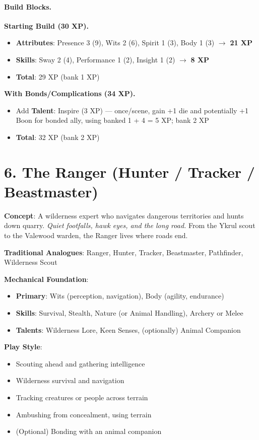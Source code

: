 \paragraph{Build Blocks.}
\textbf{Starting Build (30 XP).}
\begin{itemize}
\item \textbf{Attributes}: Presence 3 (9), Wits 2 (6), Spirit 1 (3), Body 1 (3) $\rightarrow$ \textbf{21 XP}
\item \textbf{Skills}: Sway 2 (4), Performance 1 (2), Insight 1 (2) $\rightarrow$ \textbf{8 XP}
\item \textbf{Total}: 29 XP (bank 1 XP)
\end{itemize}
\textbf{With Bonds/Complications (34 XP).}
\begin{itemize}
\item Add \textbf{Talent}: Inspire (3 XP) — once/scene, gain +1 die and potentially +1 Boon for bonded ally, using banked 1 + 4 = 5 XP; bank 2 XP
\item \textbf{Total}: 32 XP (bank 2 XP)
\end{itemize}

\section{6. The Ranger (Hunter / Tracker / Beastmaster)}
\label{sec:concept-ranger}

\textbf{Concept}: A wilderness expert who navigates dangerous territories and hunts down quarry. \emph{Quiet footfalls, hawk eyes, and the long road.} From the Ykrul scout to the Valewood warden, the Ranger lives where roads end.

\textbf{Traditional Analogues}: Ranger, Hunter, Tracker, Beastmaster, Pathfinder, Wilderness Scout

\textbf{Mechanical Foundation}:
\begin{itemize}
\item \textbf{Primary}: Wits (perception, navigation), Body (agility, endurance)
\item \textbf{Skills}: Survival, Stealth, Nature (or Animal Handling), Archery or Melee
\item \textbf{Talents}: Wilderness Lore, Keen Senses, (optionally) Animal Companion
\end{itemize}

\textbf{Play Style}:
\begin{itemize}
\item Scouting ahead and gathering intelligence
\item Wilderness survival and navigation
\item Tracking creatures or people across terrain
\item Ambushing from concealment, using terrain
\item (Optional) Bonding with an animal companion
\end{itemize}

